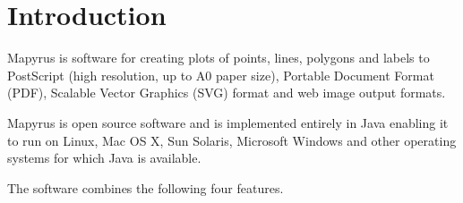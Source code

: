 
\section{Introduction}

Mapyrus is software for
creating plots of points, lines, polygons and labels 
to PostScript (high resolution, up to A0 paper size),
Portable Document Format (PDF),
Scalable Vector Graphics (SVG) format
and web image output formats.

Mapyrus is open source software and is implemented entirely in Java
enabling it to run on Linux, Mac OS X, Sun Solaris, Microsoft Windows
and other operating systems for which Java is available.

The software combines the following four features.

